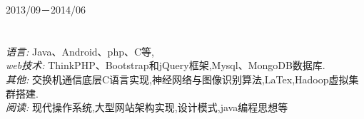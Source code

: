 \documentclass[margin]{res}
\begin{document}
\begin{resume}
            {}\hfill 2013/09－2014/06 \\

\section{ }
            {\sl 语言:} Java、Android、php、C等, \\
            {\sl web技术:} ThinkPHP、Bootstrap和jQuery框架,Mysql、MongoDB数据库. \\
            {\sl 其他:} 交换机通信底层C语言实现,神经网络与图像识别算法,LaTex,Hadoop虚拟集群搭建.\\
            {\sl 阅读:} 现代操作系统,大型网站架构实现,设计模式,java编程思想等
 

\end{resume}
\end{document}
